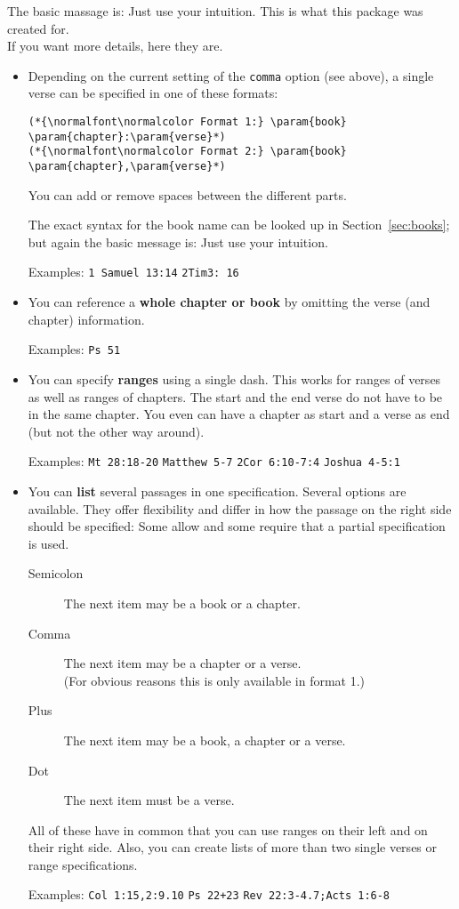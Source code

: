 \documentclass[DIV12,BCOR0mm]{scrartcl}
\newcommand{\param}[1]{$\langle${\normalfont\itshape #1\/}$\rangle$}
\newcommand{\option}[1]{{\normalfont\texttt{\color{blue!50!black}#1}}}
\begin{document}
The basic massage is: Just use your intuition. This is what this package was
created for.\\
If you want more details, here they are.
\begin{itemize}
 \item Depending on the current setting of the \option{comma} option (see
  above), a single verse can be specified in one of these formats:
\begin{lstlisting}
(*{\normalfont\normalcolor Format 1:} \param{book} \param{chapter}:\param{verse}*)
(*{\normalfont\normalcolor Format 2:} \param{book} \param{chapter},\param{verse}*)
\end{lstlisting}
  You can add or remove spaces between the different parts.

  The exact syntax for the book name can be looked up in
  Section~\ref{sec:books}; but again the basic message is: Just use your
  intuition.

  Examples:\qquad\option{Mark 16:5}\qquad
  \option{1 Samuel 13:14}\qquad
  \option{2Tim3: 16}
 \item You can reference a \textbf{whole chapter or book} by omitting the verse
  (and chapter) information.

  Examples:\qquad\option{1 John}\qquad
  \option{Ps 51}
 \item You can specify \textbf{ranges} using a single dash. This works for
  ranges of verses as well as ranges of chapters. The start and the end verse do
  not have to be in the same chapter. You even can have a chapter as start and a
  verse as end (but not the other way around).

  Examples:\qquad
  \option{Mt 28:18-20}\qquad
  \option{Matthew 5-7}\qquad
  \option{2Cor 6:10-7:4}\qquad
  \option{Joshua 4-5:1}
 \item You can \textbf{list} several passages in one specification. Several
  options are available. They offer flexibility and differ in how the passage on
  the right side should be specified: Some allow and some require that a partial
  specification is used.
  \begin{description}
   \item[Semicolon] The next item may be a book or a chapter.
   \item[Comma] The next item may be a chapter or a verse.\\
    (For obvious reasons this is only available in format 1.)
   \item[Plus] The next item may be a book, a chapter or a verse.
   \item[Dot] The next item must be a verse.
  \end{description}
  All of these have in common that you can use ranges on their left and on their
  right side. Also, you can create lists of more than two single verses or range
  specifications.

  Examples:\qquad
  \option{Col 1:15,2:9.10}\qquad
  \option{Ps 22+23}\qquad
  \option{Rev 22:3-4.7;Acts 1:6-8}
\end{itemize}
\end{document}
